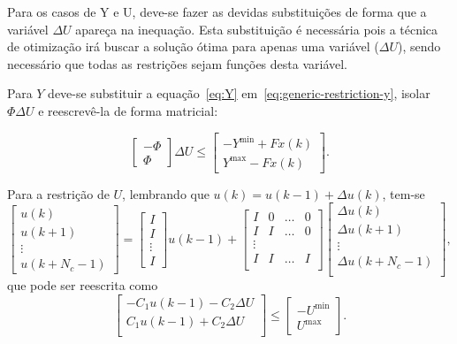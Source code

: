 Para os casos de Y e U, deve-se fazer as devidas substituições de forma que a
variável \( \Delta{}U \) apareça na inequação. Esta substituição é necessária
pois a técnica de otimização irá buscar a solução ótima para apenas uma variável
(\( \Delta{}U \)), sendo necessário que todas as restrições sejam funções desta
variável.

Para \( Y \) deve-se substituir a equação~\eqref{eq:Y}
em~\eqref{eq:generic-restriction-y}, isolar \( \Phi{}\Delta{}U \) e reescrevê-la
de forma matricial:

\begin{equation}
	\label{eq:generic-restriction-y-matrix-form}
	\begin{bmatrix}
		-\Phi \\
		\Phi
	\end{bmatrix} \Delta{}U \le
	\begin{bmatrix}
		-Y^{\min} + Fx(k) \\
		Y^{\max} - Fx(k)
	\end{bmatrix}.
\end{equation}

Para a restrição de \( U \), lembrando que \( u(k) = u(k-1) + \Delta{}u(k) \),
tem-se
%
\begin{equation}
	\label{eq:generic-restriction-u-matrix-eq}
	\begin{bmatrix}
		u(k)   \\
		u(k+1) \\
		\vdots \\
		u(k+N_c-1)
	\end{bmatrix} =
	\begin{bmatrix}
		I      \\
		I      \\
		\vdots \\
		I
	\end{bmatrix}
	u(k-1) +
	\begin{bmatrix}
		I & 0 & \hdots & 0 \\
		I & I & \hdots & 0 \\
		\vdots             \\
		I & I & \hdots & I \\
	\end{bmatrix}
	\begin{bmatrix}
		\Delta{}u(k)       \\
		\Delta{}u(k+1)     \\
		\vdots             \\
		\Delta{}u(k+N_c-1) \\
	\end{bmatrix},
\end{equation}
%
que pode ser reescrita como
%
\begin{equation}
	\label{eq:generic-restriction-u-matrix-form}
	\begin{bmatrix}
		-C_1u(k-1) - C_2\Delta{}U \\
		C_1u(k-1) + C_2\Delta{}U  \\
	\end{bmatrix} \le
	\begin{bmatrix}
		-U^{\min} \\
		U^{\max}
	\end{bmatrix}.
\end{equation}


